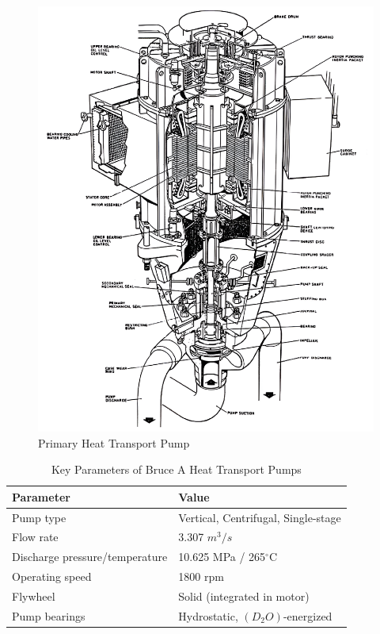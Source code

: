 \documentclass[12pt]{article}
\begin{document}
\begin{figure}
    \centering
    \includegraphics[width=0.5\linewidth]{figs/pumps.png}
    \caption{Primary Heat Transport Pump}
    \label{fig:fig_3}
\end{figure}

\begin{table}[h]
    \centering
    \caption{Key Parameters of Bruce A Heat Transport Pumps}
    \label{tab:tab_3}
    \renewcommand{\arraystretch}{1.2}
    \begin{tabularx}{\textwidth}{X X} %
    \hline
    \textbf{Parameter} & \textbf{Value} \\ 
    \hline
    Pump type & Vertical, Centrifugal, Single-stage  \\ 
    Flow rate & 3.307 $m^3/s$ \\ 
    Discharge pressure/temperature & 10.625 MPa / 265$^{\circ}$C \\ 
    Operating speed & 1800 rpm \\ 
    Flywheel & Solid (integrated in motor) \\ 
    Pump bearings & Hydrostatic, $(D_{2}O)$-energized \\
    \hline
    \end{tabularx}
\end{table}
\end{document}
